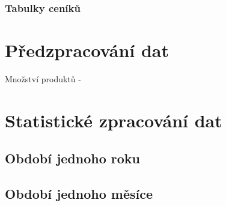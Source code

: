 \subsubsection{Tabulky ceníků}


\section{Předzpracování dat}

Množství produktů - 


\section{Statistické zpracování dat}



\subsection{Období jednoho roku}





\subsection{Období jednoho měsíce}





